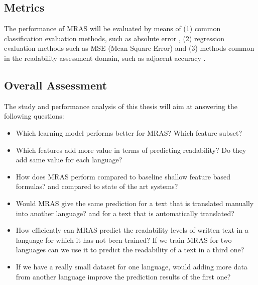 \documentclass[12pt]{article}
\begin{document}

\subsection{Metrics}
The performance of MRAS will be evaluated by means of (1) common classification evaluation methods, such as absolute error \cite{croft2010search}, (2) regression evaluation methods such as MSE (Mean Square Error) \cite{croft2010search} and (3) methods common in the readability assessment domain, such as adjacent accuracy \cite{franccois2012ai}. 

\subsection{Overall Assessment}
The study and performance analysis of this thesis will aim at answering the following questions:
\begin{itemize}

\item Which learning model performs better for MRAS? Which feature subset?
\item Which features add more value in terms of predicting readability? Do they add same value for each language?
\item How does MRAS perform compared to baseline shallow feature based formulas? and compared to state of the art systems?
\item Would MRAS give the same prediction for a text that is translated manually into another language? and for a text that is automatically translated?
\item How efficiently can MRAS predict the readability levels of written text in a language for which it has not been trained? If we train MRAS for two languages can we use it to predict the readability of a text in a third one?
\item If we have a really small dataset for one language, would adding more data from another language improve the prediction results of the first one?

\end{itemize}
\end{document}
